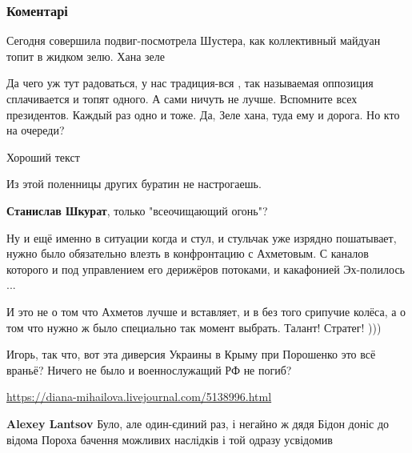  
 
 
 
 
\subsubsection{Коментарі}

\begin{itemize} %
Сегодня совершила подвиг-посмотрела Шустера, как коллективный майдуан топит в жидком зелю. Хана зеле


Да чего уж тут радоваться, у нас традиция-вся , так называемая оппозиция
сплачивается и топят одного. А сами ничуть не лучше. Вспомните всех
президентов. Каждый раз одно и тоже. Да, Зеле хана, туда ему и дорога. Но кто на
очереди?


Хороший текст

Из этой поленницы других буратин не настрогаешь.

\textbf{Станислав Шкурат}, только "всеочищающий огонь"?


Ну и ещё именно в ситуации когда и стул, и стульчак уже изрядно пошатывает,
нужно было обязательно влезть в конфронтацию с Ахметовым. С каналов которого и
под управлением его дерижёров потоками, и какафонией Эх-полилось ...

И это не о том что Ахметов лучше и вставляет, и в без того срипучие колёса, а о
том что нужно ж было специально так момент выбрать. Талант! Стратег! )))


Игорь, так что, вот эта диверсия Украины в Крыму при Порошенко это всё враньё?
Ничего не было и военнослужащий РФ не погиб?

\url{https://diana-mihailova.livejournal.com/5138996.html}

\begin{itemize} %
\textbf{Alexey Lantsov} Було, але один-єдиний раз, і негайно ж дядя Бідон доніс до відома Пороха бачення можливих наслідків і той одразу усвідомив


\end{itemize}
\end{itemize}
